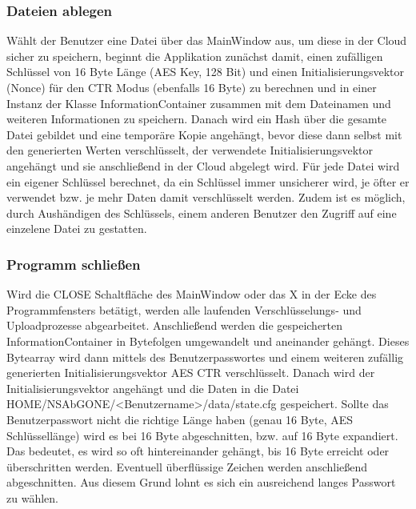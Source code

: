 \documentclass[13pt,a4paper,bibliography=totocnumbered,listof=totocnumbered]{scrartcl}
\begin{document}
\subsubsection{Dateien ablegen}
Wählt der Benutzer eine Datei über das MainWindow aus, um diese in der Cloud sicher zu speichern, beginnt die Applikation zunächst damit, einen zufälligen Schlüssel von 16 Byte Länge (AES Key, 128 Bit) und einen Initialisierungsvektor (Nonce) für den CTR Modus (ebenfalls 16 Byte) zu berechnen und in einer Instanz der Klasse InformationContainer zusammen mit dem Dateinamen und weiteren Informationen zu speichern. Danach wird ein Hash über die gesamte Datei gebildet und eine temporäre Kopie angehängt, bevor diese dann selbst mit den generierten Werten verschlüsselt, der verwendete Initialisierungsvektor angehängt und sie anschließend in der Cloud abgelegt wird. Für jede Datei wird ein eigener Schlüssel berechnet, da ein Schlüssel immer unsicherer wird, je öfter er verwendet bzw. je mehr Daten damit verschlüsselt werden. Zudem ist es möglich, durch Aushändigen des Schlüssels, einem anderen Benutzer den Zugriff auf eine einzelene Datei zu gestatten.
\subsubsection{Programm schließen}
Wird die CLOSE Schaltfläche des MainWindow oder das X in der Ecke des Programmfensters betätigt, werden alle laufenden Verschlüsselungs- und Uploadprozesse abgearbeitet. Anschließend werden die gespeicherten InformationContainer in Bytefolgen umgewandelt und aneinander gehängt. Dieses Bytearray wird dann mittels des Benutzerpasswortes und einem weiteren zufällig generierten Initialisierungsvektor AES CTR verschlüsselt. Danach wird der Initialisierungsvektor angehängt und die Daten in die Datei HOME/NSAbGONE/\textless Benutzername\textgreater/data/state.cfg gespeichert. Sollte das Benutzerpasswort nicht die richtige Länge haben (genau 16 Byte, AES Schlüssellänge) wird es bei 16 Byte abgeschnitten, bzw. auf 16 Byte expandiert. Das bedeutet, es wird so oft hintereinander gehängt, bis 16 Byte erreicht oder überschritten werden. Eventuell überflüssige Zeichen werden anschließend abgeschnitten. Aus diesem Grund lohnt es sich ein ausreichend langes Passwort zu wählen.
\end{document}
